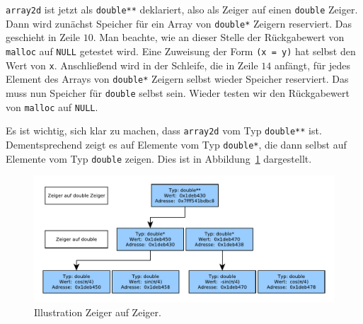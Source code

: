 \verb|array2d| ist jetzt als \verb|double**| deklariert, also als Zeiger auf einen \verb|double| Zeiger. 
Dann wird zunächst Speicher für ein Array von \verb|double*| Zeigern reserviert.
Das geschieht in Zeile $10$.
Man beachte, wie an dieser Stelle der Rückgabewert von \verb|malloc| auf \verb|NULL| getestet wird.
Eine Zuweisung der Form \verb|(x = y)| hat selbst den Wert von \verb|x|.
Anschließend wird in der Schleife, die in Zeile $14$ anfängt, für jedes Element des Arrays von \verb|double*| Zeigern selbst wieder Speicher reserviert.
Das muss nun Speicher für \verb|double| selbst sein.
Wieder testen wir den Rückgabewert von \verb|malloc| auf \verb|NULL|.

Es ist wichtig, sich klar zu machen, dass \verb|array2d| vom Typ \verb|double**| ist.
Dementsprechend zeigt es auf Elemente vom Typ \verb|double*|, die dann selbst auf Elemente vom Typ \verb|double| zeigen.
Dies ist in Abbildung~\ref{fig:mem2d} dargestellt.

\begin{figure}[!ht]
\includegraphics[width=\textwidth]{graphics/zeiger_auf_zeiger}
\caption{\label{fig:mem2d} Illustration Zeiger auf Zeiger.}
\end{figure}

